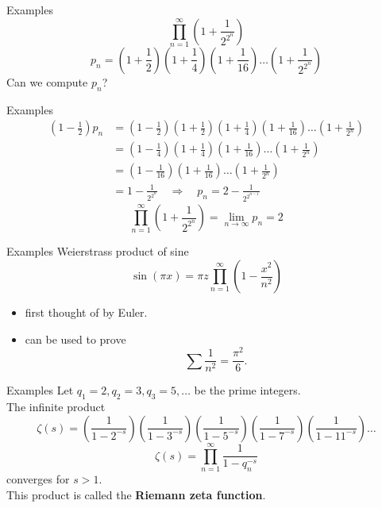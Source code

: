 \documentclass{beamer}
\begin{document}
\begin{frame}{Examples}
$$\prod_{n=1}^\infty \left(1+\frac{1}{2^{2^n}}\right)$$
$$p_n = \left(1+\frac{1}{2}\right)\left(1+\frac{1}{4}\right)\left(1+\frac{1}{16}\right)\dots\left(1+\frac{1}{2^{2^n}}\right)$$
Can we compute $p_n$?
\end{frame}

\begin{frame}{Examples}\mbox{}
{\small
\begin{align*}
\left(1-\frac{1}{2}\right)p_n
  & = \left(1-\frac{1}{2}\right)\left(1+\frac{1}{2}\right)\left(1+\frac{1}{4}\right)\left(1+\frac{1}{16}\right)\dots\left(1+\frac{1}{2^n}\right)\\
  & = \left(1-\frac{1}{4}\right)\left(1+\frac{1}{4}\right)\left(1+\frac{1}{16}\right)\dots\left(1+\frac{1}{2^n}\right)\\
  & = \left(1-\frac{1}{16}\right)\left(1+\frac{1}{16}\right)\dots\left(1+\frac{1}{2^n}\right)\\
  & = 1-\frac{1}{2^{2^n}}\quad\Longrightarrow\quad p_n = 2-\frac{1}{2^{2^{n-1}}}
\end{align*}
}
$$\prod_{n=1}^\infty \left(1+\frac{1}{2^{2^n}}\right) = \lim_{n\rightarrow\infty} p_n = 2$$
\end{frame}

\begin{frame}{Examples}
Weierstrass product of sine
$$\sin(\pi x) = \pi z\prod_{n=1}^\infty \left(1-\frac{x^2}{n^2}\right)$$
\begin{itemize}
\item first thought of by Euler.
\item can be used to prove 
$$\sum \frac{1}{n^2} = \frac{\pi^2}{6}.$$
\end{itemize}
\end{frame}

\begin{frame}{Examples}
Let $q_1=2,q_2=3,q_3=5,\dots$ be the prime integers.\\
The infinite product
{\small
$$\zeta(s) = \left(\frac{1}{1-2^{-s}}\right)\left(\frac{1}{1-3^{-s}}\right)\left(\frac{1}{1-5^{-s}}\right)\left(\frac{1}{1-7^{-s}}\right)\left(\frac{1}{1-11^{-s}}\right)\dots$$
}
$$\zeta(s) = \prod_{n=1}^\infty \frac{1}{1-q_n^{-s}}$$
converges for $s>1$.\\
This product is called the \textbf{Riemann zeta function}.
\end{frame}
\end{document}
